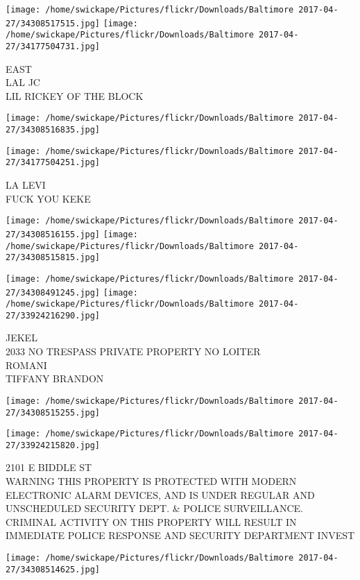 \documentclass[10pt,letterpaper]{article}
\begin{document}
\vspace{0.25in}
\texttt{[image: /home/swickape/Pictures/flickr/Downloads/Baltimore 2017-04-27/34308517515.jpg]}
\texttt{[image: /home/swickape/Pictures/flickr/Downloads/Baltimore 2017-04-27/34177504731.jpg]}

EAST\\
LAL JC\\
LIL RICKEY OF THE BLOCK
\pagebreak

\texttt{[image: /home/swickape/Pictures/flickr/Downloads/Baltimore 2017-04-27/34308516835.jpg]}

\vspace{0.25in}
\texttt{[image: /home/swickape/Pictures/flickr/Downloads/Baltimore 2017-04-27/34177504251.jpg]}

LA LEVI\\
FUCK YOU KEKE
\pagebreak

\texttt{[image: /home/swickape/Pictures/flickr/Downloads/Baltimore 2017-04-27/34308516155.jpg]}
\texttt{[image: /home/swickape/Pictures/flickr/Downloads/Baltimore 2017-04-27/34308515815.jpg]}

\texttt{[image: /home/swickape/Pictures/flickr/Downloads/Baltimore 2017-04-27/34308491245.jpg]}
\texttt{[image: /home/swickape/Pictures/flickr/Downloads/Baltimore 2017-04-27/33924216290.jpg]}

JEKEL\\
2033 NO TRESPASS PRIVATE PROPERTY NO LOITER\\
ROMANI\\
TIFFANY BRANDON
\pagebreak

\texttt{[image: /home/swickape/Pictures/flickr/Downloads/Baltimore 2017-04-27/34308515255.jpg]}

\vspace{0.25in}
\texttt{[image: /home/swickape/Pictures/flickr/Downloads/Baltimore 2017-04-27/33924215820.jpg]}

2101 E BIDDLE ST\\
WARNING THIS PROPERTY IS PROTECTED WITH MODERN ELECTRONIC ALARM DEVICES, AND IS UNDER REGULAR AND UNSCHEDULED SECURITY DEPT. \& POLICE SURVEILLANCE.  CRIMINAL ACTIVITY ON THIS PROPERTY WILL RESULT IN IMMEDIATE POLICE RESPONSE AND SECURITY DEPARTMENT INVEST
\pagebreak

\texttt{[image: /home/swickape/Pictures/flickr/Downloads/Baltimore 2017-04-27/34308514625.jpg]}
\end{document}
